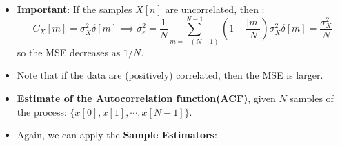 \begin{itemize}
\[\begin{aligned}
\\[2ex]
&= \frac{\sigma_X^2}{N} + \frac{1}{N^2} \sum_{n=1}^{N-1}\sum_{k=1}^{N-1} \rho \sigma_X^2
= \frac{\sigma_X^2}{N} + \frac{N(N-1)}{N^2} \rho \sigma_X^2
\\[2ex]
&= \frac{\sigma_X^2}{N} + \rho \sigma_X^2 \left(1-\frac{1}{N}\right)
\\[2ex]
\lim_{N\to\infty} MSE\{\hat{\eta}_X\} 
&= \lim_{N\to\infty} \left[ \frac{\sigma_X^2}{N} + \rho \sigma_X^2 \left(1-\frac{1}{N}\right) \right]
= \rho \sigma_X^2 = \sigma_S^2 \ne 0 \quad \text{if } \rho \ne 0
\end{aligned}
\]
\noindent In this case, the \textbf{Sample Mean} is \textbf{not} a consistent estimator of the mean \(\eta_X\).


\item \textbf{Important}: If the samples \(X[n]\) are uncorrelated, then :
\[
C_X[m] = \sigma_X^2 \delta[m]
\implies
\sigma_\varepsilon^2 = \frac{1}{N} \sum_{m=-(N-1)}^{N-1} \left(1-\frac{|m|}{N}\right) \sigma_X^2 \delta[m]
= \frac{\sigma_X^2}{N}
\]
\noindent so the MSE decreases as \(1/N\).

\item Note that if the data are (positively) correlated, then the MSE is larger.

\item \textbf{Estimate of the Autocorrelation function(ACF)}, given \(N\) samples of the process: \(\{x[0],x[1],\cdots,x[N-1]\}\).
\item Again, we can apply the \textbf{Sample Estimators}:


\end{itemize}
